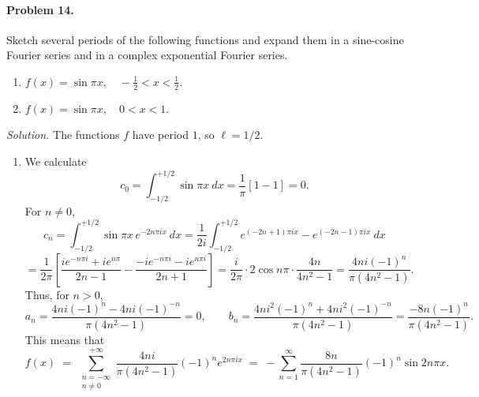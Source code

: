 \documentclass[10pt]{article}
\begin{document}
        \paragraph{Problem 14.} Sketch several periods of the following functions and expand them in a sine-cosine Fourier series and in a 
        complex exponential Fourier series.
        \begin{enumerate}
                \item \(f(x) = \sin{\pi x}, \quad -\frac{1}{2} < x < \frac{1}{2}\).
                \item \(f(x) = \sin{\pi x}, \quad 0 < x < 1\).
        \end{enumerate}
        \textit{Solution.}
        The functions $f$ have period $1$, so $\ell = 1 /2$.
        \begin{enumerate}
                \item We calculate 
                \[
                        c_0 = \int_{-1 /2}^{+1 /2} \sin{\pi x}\:dx = \frac{1}{\pi}\left[1 - 1\right] = 0.
                \]
                For $n \neq 0$, 
                \[
                        c_n = \int_{-1 /2}^{+1 /2} \sin{\pi x}\, e^{-2n\pi i x}\:dx 
                                = \frac{1}{2i} \int_{-1 /2}^{+1 /2}e^{(-2n + 1)\pi ix} - e^{(-2n - 1)\pi ix}\:dx
                \]
                \[
                        = \frac{1}{2\pi} \left[\frac{ie^{-n\pi i} + ie^{n\pi}}{2n - 1} - \frac{-ie^{-n\pi i} - ie^{n\pi i}}{2n + 1}\right]
                        = \frac{i}{2\pi}\cdot 2\cos{n\pi}\cdot\frac{4n}{4n^2 - 1}
                        = \frac{4ni(-1)^n}{\pi(4n^2 - 1)}.
                \]
                Thus, for $n > 0$, 
                \[
                        a_n = \frac{4ni(-1)^n - 4ni(-1)^{-n}}{\pi(4n^2 - 1)} = 0, \qquad
                        b_n = \frac{4ni^2(-1)^n + 4ni^2(-1)^{-n}}{\pi(4n^2 - 1)} = \frac{-8n(-1)^n}{\pi(4n^2 - 1)}.
                \]
                This means that
                \[
                        f(x) \;=\; \sum_{\substack{n = -\infty \\ n \neq 0}}^{+\infty} \frac{4ni}{\pi(4n^2 - 1)}(-1)^n e^{2n\pi ix} \;=\;
                                -\sum_{n = 1}^\infty \frac{8n}{\pi(4n^2 - 1)}(-1)^n\sin{2n\pi x}. \tag{$\star$}
                \]
                

\end{enumerate}
\end{document}
